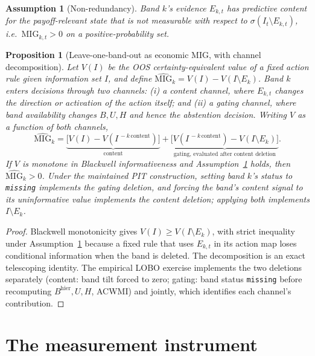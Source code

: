\documentclass[12pt]{article}
\newtheorem{proposition}{Proposition}
\newtheorem{assumption}{Assumption}
\begin{document}
\begin{assumption}[Non-redundancy]
\label{ass:nonredundant}
Band $k$'s evidence $E_{k,t}$ has predictive content for the payoff-relevant state that is not measurable with respect to $\sigma(I_t\setminus E_{k,t})$, i.e.\ $\mathrm{MIG}_{k,t}>0$ on a positive-probability set.
\end{assumption}

\begin{proposition}[Leave-one-band-out as economic MIG, with channel decomposition]
\label{prop:lobo}
Let $V(I)$ be the OOS certainty-equivalent value of a fixed action rule given information set $I$, and define $\widehat{\mathrm{MIG}}_k=V(I)-V(I\setminus E_k)$. Band $k$ enters decisions through two channels: (i) a \emph{content} channel, where $E_{k,t}$ changes the direction or activation of the action itself; and (ii) a \emph{gating} channel, where band availability changes $B,U,H$ and hence the abstention decision. Writing $V$ as a function of both channels,
\[
\widehat{\mathrm{MIG}}_k=\underbrace{\bigl[V(I)-V(I^{\,-k\,\mathrm{content}})\bigr]}_{\text{content}}
+\underbrace{\bigl[V(I^{\,-k\,\mathrm{content}})-V(I\setminus E_k)\bigr]}_{\text{gating, evaluated after content deletion}}.
\]
If $V$ is monotone in Blackwell informativeness and Assumption~\ref{ass:nonredundant} holds, then $\widehat{\mathrm{MIG}}_k>0$. Under the maintained PIT construction, setting band $k$'s status to \texttt{missing} implements the gating deletion, and forcing the band's content signal to its uninformative value implements the content deletion; applying both implements $I\setminus E_k$.
\end{proposition}
\begin{proof}
Blackwell monotonicity gives $V(I)\ge V(I\setminus E_k)$, with strict inequality under Assumption~\ref{ass:nonredundant} because a fixed rule that uses $E_{k,t}$ in its action map loses conditional information when the band is deleted. The decomposition is an exact telescoping identity. The empirical LOBO exercise implements the two deletions separately (content: band tilt forced to zero; gating: band status \texttt{missing} before recomputing $B^{\mathrm{hier}},U,H$, ACWMI) and jointly, which identifies each channel's contribution.
\end{proof}

\section{The measurement instrument}
\label{sec:lab}
\end{document}
